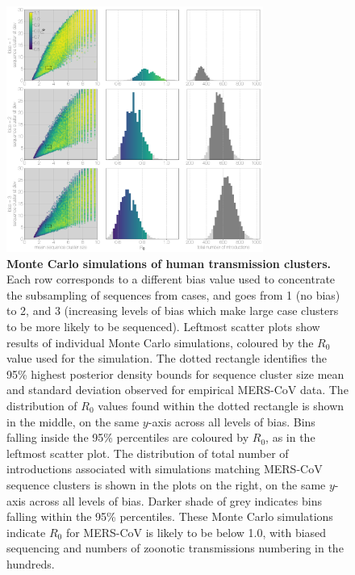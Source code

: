 \documentclass[11pt,oneside,letterpaper]{article}
\begin{document}
\begin{figure}[h]
\centering
	\includegraphics[width=0.75\textwidth]{figures/mers_epi.png}
	\caption{\textbf{Monte Carlo simulations of human transmission clusters.}
Each row corresponds to a different bias value used to concentrate the subsampling of sequences from cases, and goes from 1 (no bias) to 2, and 3 (increasing levels of bias which make large case clusters to be more likely to be sequenced).
Leftmost scatter plots show results of individual Monte Carlo simulations, coloured by the $R_{0}$ value used for the simulation.
The dotted rectangle identifies the 95\% highest posterior density bounds for sequence cluster size mean and standard deviation observed for empirical MERS-CoV data.
The distribution of $R_{0}$ values found within the dotted rectangle is shown in the middle, on the same $y$-axis across all levels of bias.
Bins falling inside the 95\% percentiles are coloured by $R_{0}$, as in the leftmost scatter plot.
The distribution of total number of introductions associated with simulations matching MERS-CoV sequence clusters is shown in the plots on the right, on the same $y$-axis across all levels of bias.
Darker shade of grey indicates bins falling within the 95\% percentiles.
These Monte Carlo simulations indicate $R_{0}$ for MERS-CoV is likely to be below 1.0, with biased sequencing and numbers of zoonotic transmissions numbering in the hundreds.
	}
	\label{mers_epi}
\end{figure}
\end{document}
